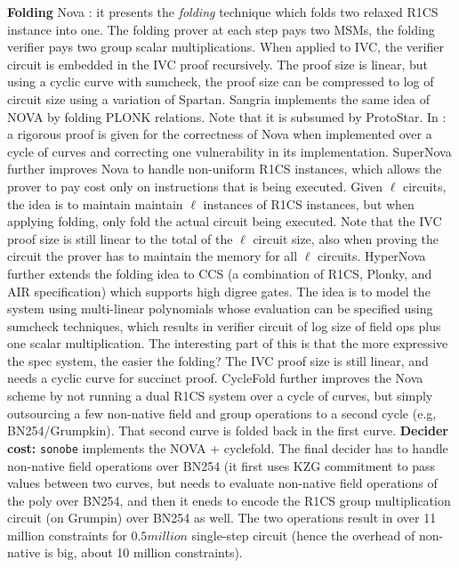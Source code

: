 {\bf Folding}
Nova \cite{Nova}: it presents the {\em folding} technique which folds
two relaxed R1CS instance into one. The folding prover at each step
pays two MSMs, the folding verifier pays two group scalar multiplications.
When applied to IVC, the verifier circuit is embedded in the IVC
proof recursively. The proof size is linear, but using a cyclic curve
with sumcheck, the proof size can be compressed to log of circuit size
using a variation of Spartan. 
Sangria \cite{Sangria} implements the same idea of NOVA by
folding PLONK relations. Note that it is subsumed by
ProtoStar.
In \cite{NovaCycle}: a rigorous proof is given
for the correctness of Nova when implemented over
a cycle of curves and correcting one vulnerability in its
implementation.
SuperNova  \cite{SuperNova} further
improves Nova to handle non-uniform R1CS instances, which allows the prover
to pay cost only on instructions that is being executed.
Given $\ell$ circuits, the idea is to maintain maintain
$\ell$ instances of R1CS instances, but when applying
folding, only fold the actual circuit being executed.
Note that the IVC proof size is still linear to the total
of the $\ell$ circuit size, also when proving the circuit
the prover has to maintain the memory for all $\ell$ circuits.
HyperNova \cite{HyperNova} further extends the folding idea
to CCS (a combination of R1CS, Plonky, and AIR specification)
which supports high digree gates. The idea is to model the system
using multi-linear polynomials whose evaluation can be
specified using sumcheck techniques, which results in verifier circuit
of log size of field ops plus one scalar multiplication. The interesting
part of this is that the more expressive the spec system, the easier
the folding? The IVC proof size is still linear, and needs a cyclic
curve for succinct proof. 
CycleFold \cite{CycleFold} further
improves the Nova scheme by not running a dual R1CS system 
over a cycle of curves, but simply outsourcing a few
non-native field and group operations to a second cycle
(e.g, BN254/Grumpkin). That second curve is folded back in the
first curve. {\bf Decider cost:} \texttt{sonobe} implements
the NOVA + cyclefold. The final decider has to handle
non-native field operations over BN254 (it first uses KZG commitment
to pass values between two curves, but needs to evaluate non-native
field operations of the poly over BN254, and then it eneds to
encode the R1CS group multiplication circuit (on Grumpin) over
BN254 as well. The two operations result in over 11 million
constraints for $0.5 million$ single-step circuit (hence
the overhead of non-native is big, about 10 million constraints).
